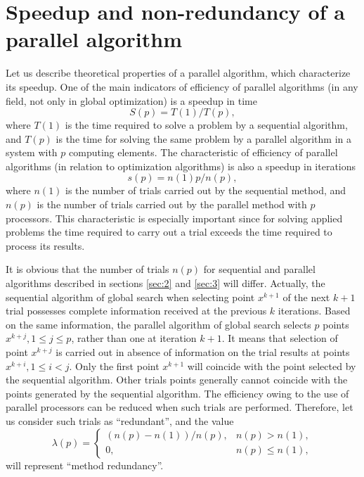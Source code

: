 \documentclass[smallcondensed]{svjour3}     %
\begin{document}
\section{Speedup and non-redundancy of a parallel algorithm} \label{sec:4}

Let us describe theoretical properties of a parallel algorithm, which characterize its speedup. One of the main indicators of efficiency of parallel algorithms (in any field, not only in global optimization) is a speedup in time
\[
S(p)=T(1)/T(p),
\]
where $T(1)$ is the time required to solve a problem by a sequential algorithm, and $T(p)$ is the time for solving the same problem by a parallel algorithm in a system with $p$ computing elements. The characteristic of efficiency of parallel algorithms (in relation to optimization algorithms) is also a speedup in iterations
\begin{equation}\label{eq:26}
s(p)=n(1)p/n(p),
\end{equation}
where $n(1)$ is the number of trials carried out by the sequential method, and $n(p)$ is the number of trials carried out by the parallel method with $p$ processors. This characteristic is especially important since for solving applied problems the time required to carry out a trial exceeds the time required to process its results.

It is obvious that the number of trials $n(p)$ for sequential and parallel algorithms described in sections \ref{sec:2} and \ref{sec:3} will differ. Actually, the sequential algorithm of global search when selecting point $x^{k+1}$ of the next $k+1$ trial possesses complete information received at the previous $k$ iterations. Based on the same information, the parallel algorithm of global search selects $p$ points $x^{k+j}, 1\leq j \leq p$, rather than one at iteration $k+1$. It means that selection of point $x^{k+j}$ is carried out in absence of information on the trial results at points $x^{k+i}, 1\leq i<j$. Only the first point $x^{k+1}$ will coincide with the point selected by the sequential algorithm. Other trials points generally cannot coincide with the points generated by the sequential algorithm. The efficiency owing to the use of parallel processors can be reduced when such trials are performed. Therefore, let us consider such trials as ``redundant'', and the value 
\[
\lambda(p) = \left\{
   \begin{array}{lr}
     (n(p)-n(1))/n(p), & n(p) > n(1),\\
     0, & n(p)\leq n(1),
   \end{array}
\right.
\]
will represent ``method redundancy''.
\end{document}
